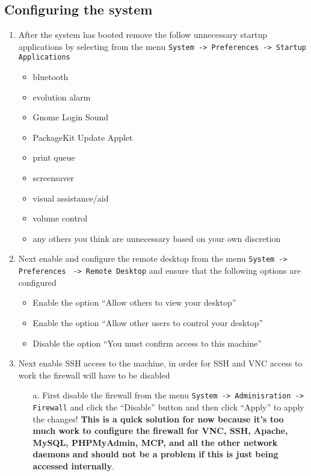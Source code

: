 \subsection{Configuring the system}
\label{sec:rhconfig}
\begin{enumerate}
\item 	After the system has booted remove the follow unnecessary startup applications by selecting from the menu  
		\verb|System -> Preferences -> Startup Applications|
\begin{itemize}
\item	bluetooth
\item	evolution alarm
\item	Gnome Login Sound
\item	PackageKit Update Applet
\item	print queue
\item	screensaver
\item	visual assistance/aid
\item	volume control
\item	any others you think are unnecessary based on your own discretion
\end{itemize}

\item	Next enable and configure the remote desktop from the menu \verb|System -> Preferences| \verb| -> Remote Desktop| 
		and ensure that the following options are configured	
\begin{itemize}
\item	Enable the option ``Allow others to view your desktop''
\item	Enable the option ``Allow other users to control your desktop''
\item	Disable the option ``You must confirm access to this machine''
\end{itemize}
			
\item	Next enable SSH access to the machine, in order for SSH and VNC access to work the firewall will have to be disabled
\begin{itemize}
\item[a.]	First disable the firewall from the menu \verb|System -> Adminisration -> Firewall| and click the ``Disable'' 
			button and then click ``Apply'' to apply the changes! {\bf This is a quick solution for now because it's too 
			much work to configure the firewall for VNC, SSH, Apache, MySQL, PHPMyAdmin, MCP, and all the other network 
			daemons and should not be a problem if this is just being accessed internally}.


\end{itemize}
\end{enumerate}
